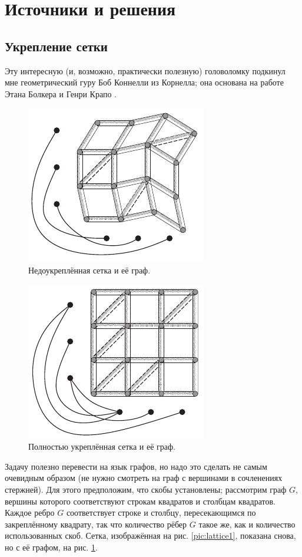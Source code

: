 \section*{Источники и решения}

\subsection*{Укрепление сетки}

Эту интересную (и, возможно, практически полезную) головоломку подкинул мне геометрический гуру Боб Коннелли из Корнелла; она основана на работе Этана Болкера и Генри Крапо \cite{bolker-crap}.


\begin{figure}[ht!]
\centering
\includegraphics[scale=1]{pics/lattice2}
\caption{Недоукреплённая сетка и её граф.}
\label{pic:lattice2}
\end{figure}

\begin{figure}[b!]
\centering
\includegraphics[scale=1]{pics/lattice3}
\caption{Полностью укреплённая сетка и её граф.}
\label{pic:lattice3}
\end{figure}

Задачу полезно перевести на язык графов, но надо это сделать не самым очевидным образом (не нужно смотреть на граф с вершинами в сочленениях стержней).
Для этого предположим, что скобы установлены;
рассмотрим граф $G$, вершины которого соответствуют строкам квадратов и столбцам квадратов.
Каждое ребро $G$ соответствует строке и столбцу, пересекающимся по закреплённому квадрату, так что количество рёбер $G$ такое же, как и количество использованных скоб.
Сетка, изображённая на рис. \ref{pic:lattice1}, показана снова, но с её графом, на рис. \ref{pic:lattice2}.

